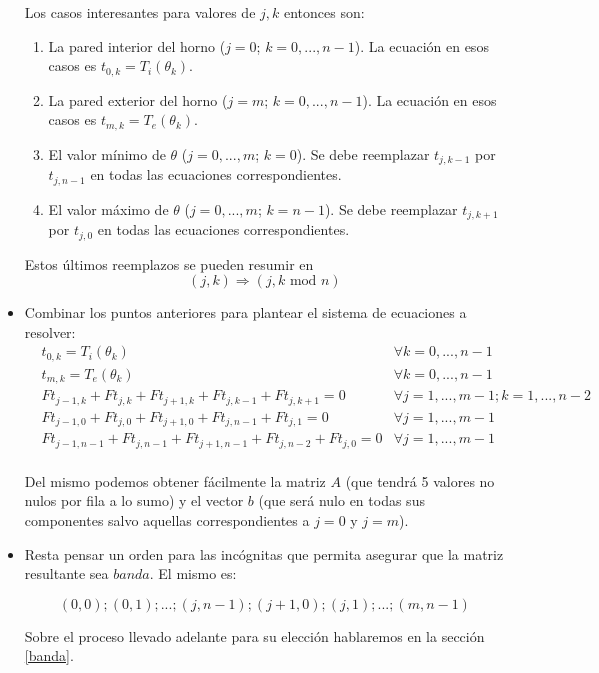 \begin{itemize}
    Los casos interesantes para valores de $j, k$ entonces son:
    \begin{enumerate}
     \item La pared interior del horno ($j = 0$; $k = 0, ..., n-1$). La ecuación en esos casos es $t_{0, k} = T_i(\theta_k)$.
     \item La pared exterior del horno ($j = m$; $k = 0, ..., n-1$). La ecuación en esos casos es $t_{m, k} = T_e(\theta_k)$.
     \item El valor mínimo de $\theta$ ($j = 0, ..., m$; $k = 0$). Se debe reemplazar $t_{j, k-1}$ por $t_{j, n-1}$ en todas las ecuaciones correspondientes.
     \item El valor máximo de $\theta$ ($j = 0, ..., m$; $k = n-1$). Se debe reemplazar $t_{j, k+1}$ por $t_{j, 0}$ en todas las ecuaciones correspondientes.
    \end{enumerate}
    Estos últimos reemplazos se pueden resumir en $$(j, k) \Rightarrow (j, k \text{ mod } n)$$
 \item
    Combinar los puntos anteriores para plantear el sistema de ecuaciones a resolver:
    \begin{align*}
    &t_{0, k} = T_i(\theta_k)                                           &\forall k = 0, ..., n-1  \\
    &t_{m, k} = T_e(\theta_k)                                           &\forall k = 0, ..., n-1  \\
    &Ft_{j-1,k} + Ft_{j,k} + Ft_{j+1,k} + Ft_{j,k-1} + Ft_{j,k+1} = 0  &\forall j=1, ..., m-1; k = 1, ... , n-2 \\
    &Ft_{j-1,0} + Ft_{j,0} + Ft_{j+1,0} + Ft_{j,n-1} + Ft_{j,1} = 0    &\forall j=1, ..., m-1 \\
    &Ft_{j-1,n-1} + Ft_{j,n-1} + Ft_{j+1,n-1} + Ft_{j,n-2} + Ft_{j,0} = 0    &\forall j=1, ..., m-1 \\
    \end{align*}

    Del mismo podemos obtener fácilmente la matriz $A$ (que tendrá 5 valores no nulos por fila a lo sumo) y el vector $b$ (que será nulo en todas sus componentes salvo aquellas correspondientes a $j=0$ y $j=m$).
  \item
    Resta pensar un orden para las incógnitas que permita asegurar que la matriz resultante sea $banda$. El mismo es:
    
    $$ (0,0); (0,1); ... ; (j,n-1); (j+1,0); (j,1); ... ; (m, n-1)$$ %
    
    Sobre el proceso llevado adelante para su elección hablaremos en la sección \ref{banda}.
\end{itemize}
